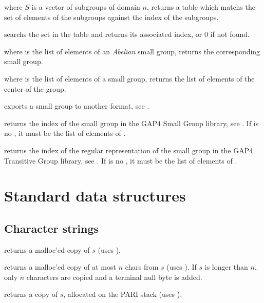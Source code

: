  where $S$ is a vector of subgroups
of domain $n$, returns a table which matchs the set of elements of the
subgroups against the index of the subgroups.

 searchs the set  in
the table  and returns its associated index, or $0$ if not found.

 where  is the list of
elements of an \emph{Abelian} small group, returns the corresponding
small group.

 where  is the list of elements
of a small group, returns the list of elements of the center of the
group.

 exports a small group
to another format, see .

 returns the index of the small group
 in the GAP4 Small Group library, see . If
 is no , it must be the list of elements of .

 returns the index of the
regular representation of the small group  in the GAP4 Transitive
Group library, see . If  is no , it must be
the list of elements of .

\newpage
\chapter{Standard data structures}

\section{Character strings}


 returns a malloc'ed copy of $s$
(uses ).

 returns a malloc'ed copy of
at most $n$ chars from $s$ (uses ). If $s$ is longer than
$n$, only $n$ characters are copied and a terminal null byte is added.

 returns a copy of $s$, allocated
on the PARI stack (uses ).

